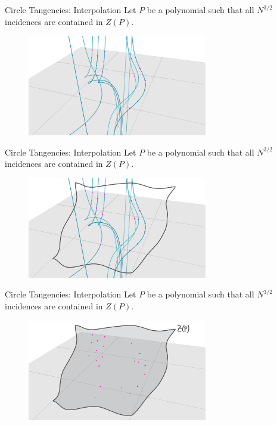 \documentclass{beamer}
\newcommand{\nfr}[1]{\begin{frame} #1
\end{frame}}
\begin{document}
\nfr{{Circle Tangencies: Interpolation}
Let $P$ be a polynomial such that all $N^{3/2}$ incidences are contained in $Z(P)$. 

\begin{figure}[h]
    \centering
    \includegraphics[width=0.7\textwidth]{images/lots_of_dots_a.png}
\end{figure}
}
\nfr{{Circle Tangencies: Interpolation}
Let $P$ be a polynomial such that all $N^{3/2}$ incidences are contained in $Z(P)$. 

\begin{figure}[h]
    \centering
    \includegraphics[width=0.7\textwidth]{images/lots_of_dots_b.png}
\end{figure}
}

\nfr{{Circle Tangencies: Interpolation}
Let $P$ be a polynomial such that all $N^{3/2}$ incidences are contained in $Z(P)$. 

\begin{figure}[h]
    \centering
    \includegraphics[width=0.7\textwidth]{images/lots_of_dots_c.png}
\end{figure}
}
\end{document}
